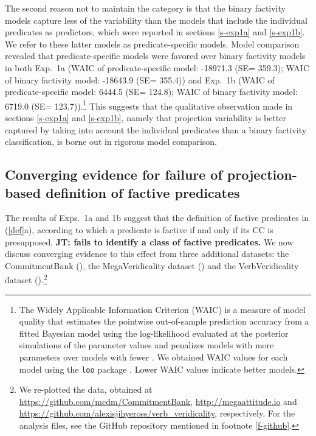\documentclass[11pt,fleqn]{article}
\newcommand{\6}{\mbox{$[\hspace*{-.6mm}[$}}
\newcommand{\9}{\mbox{$]\hspace*{-.6mm}]$}}
\newcommand{\jt}[1]{\textbf{\color{blue}JT: #1}}
\begin{document}
The second reason not to maintain the category is that the binary factivity models capture less of the variability than the models that include the individual predicates as predictors, which were reported in sections \ref{s-exp1a} and \ref{s-exp1b}. We refer to these latter models as predicate-specific models. Model comparison revealed that predicate-specific models were favored over binary factivity models in both Exp.~1a (WAIC of predicate-specific model: -18971.3 (SE= 359.3); WAIC of binary factivity model: -18643.9 (SE= 355.4))  and Exp.~1b (WAIC of predicate-specific model: 6444.5 (SE= 124.8); WAIC of binary factivity model: 6719.0 (SE= 123.7)).\footnote{The Widely Applicable Information Criterion (WAIC) is a measure of model quality that estimates the pointwise out-of-sample prediction accuracy from a fitted Bayesian model using the log-likelihood evaluated at the posterior simulations of the parameter values and penalizes models with more parameters over models with fewer \citep{watanabe2010}. We obtained WAIC values for each model using the \texttt{loo} package \citep{vehtari2017}. Lower WAIC values indicate better models.} This suggests that the qualitative observation made in sections  \ref{s-exp1a} and \ref{s-exp1b}, namely that projection variability is better captured by taking into account the individual predicates than a binary factivity classification, is borne out in rigorous model comparison. 



\subsection{Converging evidence for failure of projection-based definition of factive predicates}\label{s-converging1}

The results of  Exps.~1a and 1b suggest that the definition of factive predicates in (\ref{def}a), according to which a predicate is factive if and only if its CC is presupposed, \jt{fails to identify a class of factive predicates.} We now discuss converging evidence to this effect from three additional datasets: the CommitmentBank (\citealt*{demarneffe-etal-sub23}), the MegaVeridicality dataset (\citealt{white-rawlins-nels2018,white-etal2018b}) and the VerbVeridicality dataset (\citealt{ross-pavlick2019}).\footnote{We re-plotted the data, obtained at \url{https://github.com/mcdm/CommitmentBank}, \url{http://megaattitude.io} and \url{https://github.com/alexisjihyeross/verb_veridicality}, respectively. For the analysis files, see the GitHub repository mentioned in footnote \ref{f-github}.}
\end{document}
